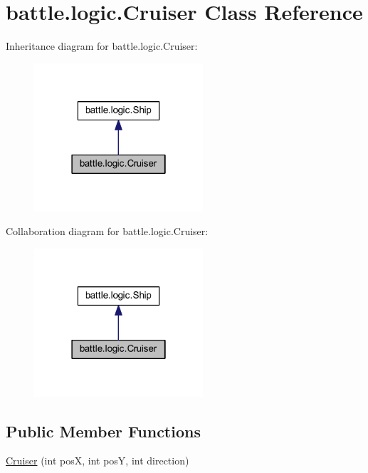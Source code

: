 \hypertarget{classbattle_1_1logic_1_1_cruiser}{}\section{battle.\+logic.\+Cruiser Class Reference}
\label{classbattle_1_1logic_1_1_cruiser}


Inheritance diagram for battle.\+logic.\+Cruiser\+:
\nopagebreak
\begin{figure}[H]
\begin{center}
\leavevmode
\includegraphics[width=178pt]{classbattle_1_1logic_1_1_cruiser__inherit__graph}
\end{center}
\end{figure}


Collaboration diagram for battle.\+logic.\+Cruiser\+:
\nopagebreak
\begin{figure}[H]
\begin{center}
\leavevmode
\includegraphics[width=178pt]{classbattle_1_1logic_1_1_cruiser__coll__graph}
\end{center}
\end{figure}
\subsection*{Public Member Functions}
\begin{DoxyCompactItemize}
\item 
\hyperlink{classbattle_1_1logic_1_1_cruiser_a1c1452932f3bb97594bc76ea50665d5a}{Cruiser} (int pos\+X, int pos\+Y, int direction)
\end{DoxyCompactItemize}


